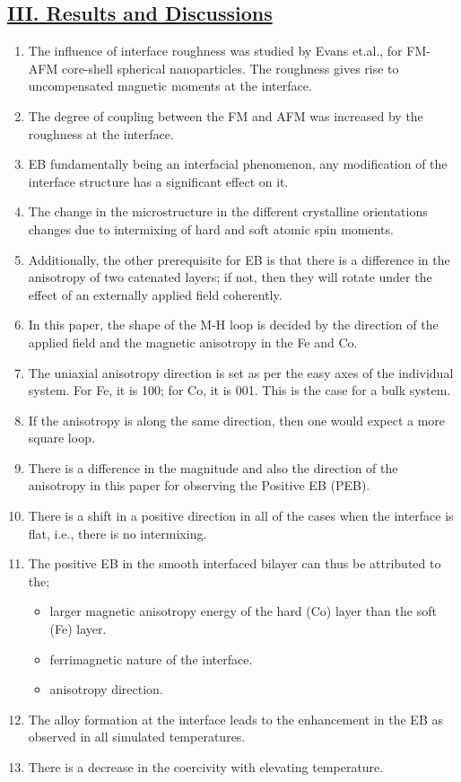 \subsection*{\underline{III. Results and Discussions}}
\begin{enumerate}
    \item The influence of interface roughness was studied by Evans et.al.,\cite{influenceofinterfacial2011} for FM-AFM core-shell spherical nanoparticles. The roughness gives rise to uncompensated magnetic moments at the interface. 
    \item The degree of coupling between the FM and AFM was increased by the roughness at the interface. 
    \item EB fundamentally being an interfacial phenomenon, any modification of the interface structure has a significant effect on it.
    \item The change in the microstructure in the different crystalline orientations changes due to intermixing of hard and soft atomic spin moments.
    \item Additionally, the other prerequisite for EB is that there is a difference in the anisotropy of two catenated layers; if not, then they will rotate under the effect of an externally applied field coherently.
    \item In this paper, the shape of the M-H loop is decided by the direction of the applied field and the magnetic anisotropy in the Fe and Co.
    \item The uniaxial anisotropy direction is set as per the easy axes of the individual system. For Fe, it is 100; for Co, it is 001. This is the case for a bulk system.
    \item If the anisotropy is along the same direction, then one would expect a more square loop.
    \item There is a difference in the magnitude and also the direction of the anisotropy in this paper for observing the Positive EB (PEB).
    \item There is a shift in a positive direction in all of the cases when the interface is flat, i.e., there is no intermixing.
    \item The positive EB in the smooth interfaced bilayer can thus be attributed to the;
    \begin{itemize}
        \item larger magnetic anisotropy energy of the hard (Co) layer than the soft (Fe) layer.
        \item ferrimagnetic nature of the interface.
        \item anisotropy direction.
    \end{itemize}
    \item The alloy formation at the interface leads to the enhancement in the EB as observed in all simulated temperatures.
    \item There is a decrease in the coercivity with elevating temperature.
\end{enumerate}

